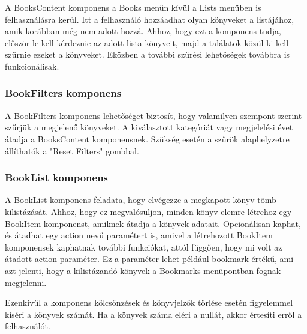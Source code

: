\bigskip

A BooksContent komponens a Books menün kívül a Lists menüben is felhasználásra kerül. Itt a felhasználó hozzáadhat olyan könyveket a listájához, amik korábban még nem adott hozzá. Ahhoz, hogy ezt a komponens tudja, először le kell kérdeznie az adott lista könyveit, majd a találatok közül ki kell szűrnie ezeket a könyveket. Eközben a további szűrési lehetőségek továbbra is funkcionálisak.

\subsubsection{BookFilters komponens}
A BookFilters komponens lehetőséget biztosít, hogy valamilyen szempont szerint szűrjük a megjelenő könyveket. A kiválasztott kategóriát vagy megjelelési évet átadja a BooksContent komponensnek. Szükség esetén a szűrök alaphelyzetre állíthatók a "Reset Filters" gombbal.

\subsubsection{BookList komponens}
A BookList komponens feladata, hogy elvégezze a megkapott könyv tömb kilistázását. Ahhoz, hogy ez megvalósuljon, minden könyv elemre létrehoz egy BookItem komponenst, amiknek átadja a könyvek adatait. Opcionálisan kaphat, és átadhat egy action nevű paramétert is, amivel a létrehozott BookItem komponensek kaphatnak további funkciókat, attól függően, hogy mi volt az átadott action paraméter. Ez a paraméter lehet például bookmark értékű, ami azt jelenti, hogy a kilistázandó könyvek a Bookmarks menüpontban fognak megjelenni.

Ezenkívül a komponens kölcsönzések és könyvjelzők törlése esetén figyelemmel kíséri a könyvek számát. Ha a könyvek száma eléri a nullát, akkor értesíti erről a felhasználót.

